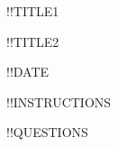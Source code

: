 \documentclass[12pt]{extarticle}
\begin{document}
\begin{center}
\Large
!!TITLE1

!!TITLE2

\large
!!DATE
\small
\end{center}	
\vspace{1mm}
\singlespacing
!!INSTRUCTIONS
\begin{enumerate}

!!QUESTIONS
 
\end{enumerate}
\end{document}
